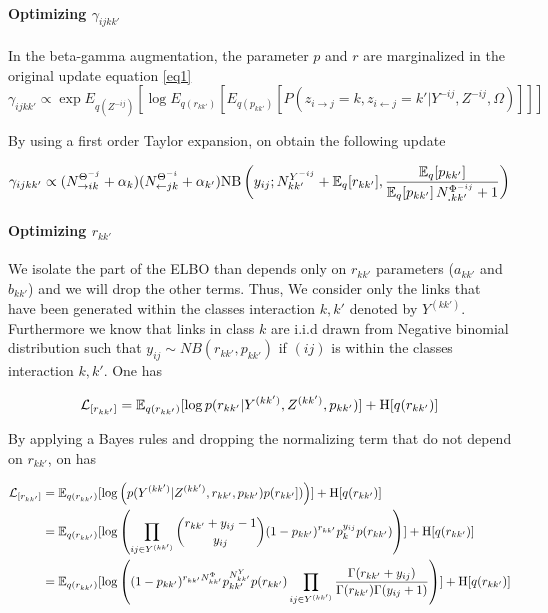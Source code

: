 \paragraph{Optimizing $\gamma_{ijkk'}$}

In the beta-gamma augmentation, the parameter $p$ and $r$ are marginalized in the original update equation \eqref{eq1}
\begin{equation}
\gamma_{ijkk'} \propto \exp E_{q(Z^{-ij})} [\log E_{q(r_{kk'})}[E_{q(p_{kk'})}[ P(z_{i\rightarrow j}=k, z_{i\leftarrow j}=k' | Y^{-ij}, Z^{-ij}, \Omega) ] ] ]
\end{equation}

By using a first order Taylor expansion, on obtain the following update

\begin{equation}
\gamma_{ijkk'} \propto (N_{\rightarrow ik}^{\Theta^{-j}} + \alpha_k) (N_{\leftarrow jk}^{\Theta^{-i}} + \alpha_{k'}) \mathrm{NB}\left(y_{ij}; N^{Y^{-ij}}_{kk'} + \mathbb{E}_{q}[r_{kk'}], \frac{\mathbb{E}_{q}[p_{kk'}]}{\mathbb{E}_{q}[p_{kk'}]\,N^{\Phi^{-ij}}_{\bm{.}kk'} + 1} \right)
\end{equation}

\paragraph{Optimizing $r_{kk'}$}

We isolate the part of the ELBO than depends only on $r_{kk'}$ parameters ($a_{kk'}$ and $b_{kk'}$) and we will drop the other terms. Thus, We consider only the links that have been generated within the classes interaction $k,k'$ denoted by $Y^{(kk')}$. Furthermore we know that links in class $k$ are i.i.d drawn from  Negative binomial distribution such that $y_{ij} \sim NB(r_{kk'}, p_{kk'})$ if $(ij)$ is within the classes interaction $k,k'$. One has

\begin{align*}
\mathcal{L}_{[r_{kk'}]} = \mathbb{E}_{q(r_{kk'})}[\log p(r_{kk'}|Y^{(kk')},Z^{(kk')},p_{kk'})] + \textrm{H}[q(r_{kk'})] \\
\end{align*}

By applying a Bayes rules and dropping the normalizing term that do not depend on $r_{kk'}$, on has

\begin{align*}
\mathcal{L}_{[r_{kk'}]} &= \mathbb{E}_{q(r_{kk'})}[\log \left( p(Y^{(kk')}|Z^{(kk')}, r_{kk'}, p_{kk'}) p(r_{kk'}]) \right)] + \textrm{H}[q(r_{kk'})] \\
    &= \mathbb{E}_{q(r_{kk'})}[\log \left( \prod_{ij\in Y^{(kk')}} \dbinom{r_{kk'} + y_{ij}-1}{y_{ij}} (1-p_{kk'})^{r_{kk'}} p_k^{y_{ij}} p(r_{kk'}) \right) ] + \textrm{H}[q(r_{kk'})] \\
    &= \mathbb{E}_{q(r_{kk'})}[\log \left( (1-p_{kk'})^{r_{kk'} N^{\Phi}_{kk'}} p_{kk'}^{N^{Y}_{kk'}} p(r_{kk'}) \prod_{ij\in Y^{(kk')}} \frac{\Gamma(r_{kk'}+y_{ij})}{\Gamma(r_{kk'}) \Gamma(y_{ij}+1) }  \right) ] + \textrm{H}[q(r_{kk'})]
\end{align*}

